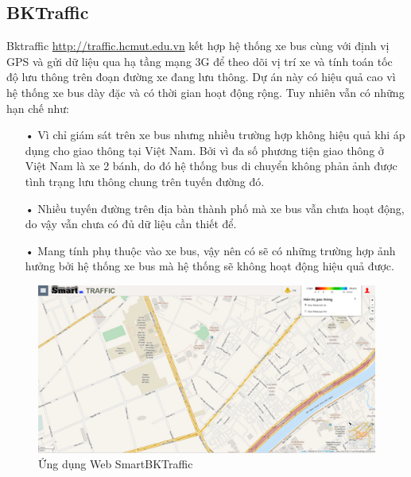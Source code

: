 \subsection{BKTraffic}
Bktraffic \url{http://traffic.hcmut.edu.vn} kết hợp hệ thống xe bus cùng với định vị GPS và gửi dữ liệu qua hạ tầng mạng 3G để theo dõi vị trí xe và tính toán tốc độ lưu thông trên đoạn đường xe đang lưu thông. Dự án này có hiệu quả cao vì hệ thống xe bus dày đặc và có thời gian hoạt động rộng. Tuy nhiên vẫn có những hạn chế như:
\begin{itemize}
	\item[•]Vì chỉ giám sát trên xe bus nhưng nhiều trường hợp không hiệu quả khi áp dụng cho giao thông tại Việt Nam. Bởi vì đa số phương tiện giao thông ở Việt Nam là xe 2 bánh, do đó hệ thống bus di chuyển không phản ảnh được tình trạng lưu thông chung trên tuyến đường đó.
	\item[•]Nhiều tuyến đường trên địa bàn thành phố mà xe bus vẫn chưa hoạt động, do vậy vẫn chưa có đủ dữ liệu cần thiết để.
	\item[•]Mang tính phụ thuộc vào xe bus, vậy nên có sẽ có những trường hợp ảnh hưởng bởi hệ thống xe bus mà hệ thống sẽ không hoạt động hiệu quả được.
\end{itemize}

\begin{figure}[H] 
	\centering    
	\includegraphics[width=1.0\textwidth]{pic2}
	\caption[Ứng dụng Web SmartBKTraffic ]{ Ứng dụng Web SmartBKTraffic}
	\label{fig:pic2}
\end{figure}

